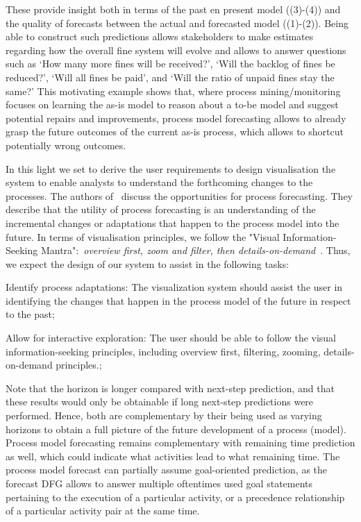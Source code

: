 These provide insight both in terms of the past en present model ((3)-(4)) and the quality of forecasts between the actual and forecasted model ((1)-(2)).
Being able to construct such predictions allows stakeholders to make estimates regarding how the overall fine system will evolve and allows to answer questions such as `How many more fines will be received?', `Will the backlog of fines be reduced?', `Will all fines be paid', and `Will the ratio of unpaid fines stay the same?'
This motivating example shows that, where process mining/monitoring focuses on learning the as-is model to reason about a to-be model and suggest potential repairs and improvements, process model forecasting allows to already grasp the future outcomes of the current as-is process, which allows to shortcut potentially wrong outcomes. 

In this light we set to derive the user requirements to design visualisation the system to enable analysts to understand the forthcoming changes to the processes. The authors of~\cite{DBLP:conf/bpm/PollPRRR18} discuss the opportunities for process forecasting. They describe that the utility of process forecasting is an understanding of the incremental changes or adaptations that happen to the process model into the future. In terms of visualisation principles, we follow the "Visual Information-Seeking Mantra":~\emph{overview first, zoom and filter, then details-on-demand}~\cite{DBLP:conf/vl/Shneiderman96}. 
Thus, we expect the design of our system to assist in the following tasks:


\begin{requidescr}
	\item[Identify process adaptations:\namedlabel{req:adaptation}] The visualization system should assist the user in identifying the changes that happen in the process model of the future in respect to the past;
	\item[Allow for interactive exploration:\namedlabel{req:interactive}] The user should be able to follow the visual information-seeking principles, including overview first, filtering, zooming, details-on-demand principles.;
\end{requidescr} %


Note that the horizon is longer compared with next-step prediction, and that these results would only be obtainable if long next-step predictions were performed.
Hence, both are complementary by their being used as varying horizons to obtain a full picture of the future development of a process (model).
Process model forecasting remains complementary with remaining time prediction as well, which could indicate what activities lead to what remaining time.
The process model forecast can partially assume goal-oriented prediction, as the forecast DFG allows to answer multiple oftentimes used goal statements pertaining to the execution of a particular activity, or a precedence relationship of a particular activity pair \cite{DBLP:journals/tkdd/TeinemaaDRM19} at the same time.
